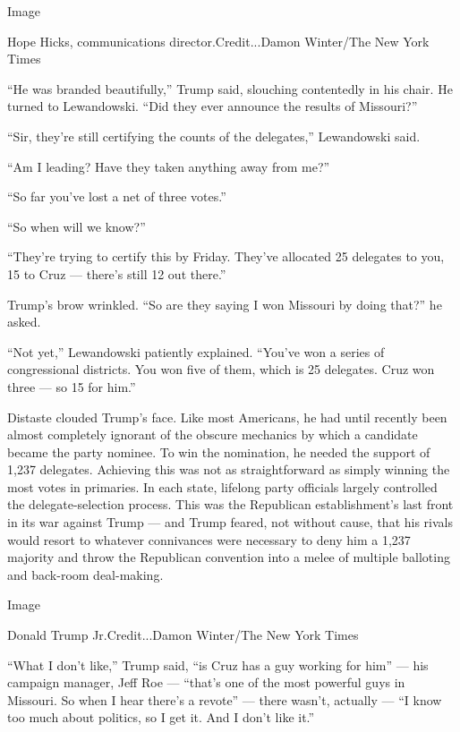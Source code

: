 Image

Hope Hicks, communications director.Credit...Damon Winter/The New York
Times

``He was branded beautifully,'' Trump said, slouching contentedly in his
chair. He turned to Lewandowski. ``Did they ever announce the results of
Missouri?''

``Sir, they're still certifying the counts of the delegates,''
Lewandowski said.

``Am I leading? Have they taken anything away from me?''

``So far you've lost a net of three votes.''

``So when will we know?''

``They're trying to certify this by Friday. They've allocated 25
delegates to you, 15 to Cruz --- there's still 12 out there.''

Trump's brow wrinkled. ``So are they saying I won Missouri by doing
that?'' he asked.

``Not yet,'' Lewandowski patiently explained. ``You've won a series of
congressional districts. You won five of them, which is 25 delegates.
Cruz won three --- so 15 for him.''

Distaste clouded Trump's face. Like most Americans, he had until
recently been almost completely ignorant of the obscure mechanics by
which a candidate became the party nominee. To win the nomination, he
needed the support of 1,237 delegates. Achieving this was not as
straightforward as simply winning the most votes in primaries. In each
state, lifelong party officials largely controlled the
delegate-selection process. This was the Republican establishment's last
front in its war against Trump --- and Trump feared, not without cause,
that his rivals would resort to whatever connivances were necessary to
deny him a 1,237 majority and throw the Republican convention into a
melee of multiple balloting and back-room deal-making.

Image

Donald Trump Jr.Credit...Damon Winter/The New York Times

``What I don't like,'' Trump said, ``is Cruz has a guy working for him''
--- his campaign manager, Jeff Roe --- ``that's one of the most powerful
guys in Missouri. So when I hear there's a revote'' --- there wasn't,
actually --- ``I know too much about politics, so I get it. And I don't
like it.''

